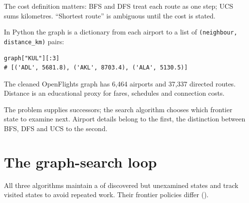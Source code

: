 The cost definition matters: BFS and DFS treat each route as one step; UCS sums kilometres. ``Shortest route'' is ambiguous until the cost is stated.

In Python the graph is a dictionary from each airport to a list of \texttt{(neighbour, distance\_km)} pairs:

\begin{lstlisting}[style=aipython]
graph["KUL"][:3]
# [('ADL', 5681.8), ('AKL', 8703.4), ('ALA', 5130.5)]
\end{lstlisting}

The cleaned OpenFlights graph has 6,464 airports and 37,337 directed routes. Distance is an educational proxy for fares, schedules and connection costs.

\begin{intuition}
The problem supplies successors; the search algorithm chooses which frontier state to examine next. Airport details belong to the first, the distinction between BFS, DFS and UCS to the second.
\end{intuition}

\section{The graph-search loop}

All three algorithms maintain a  of discovered but unexamined states and track visited states to avoid repeated work. Their frontier policies differ ().

